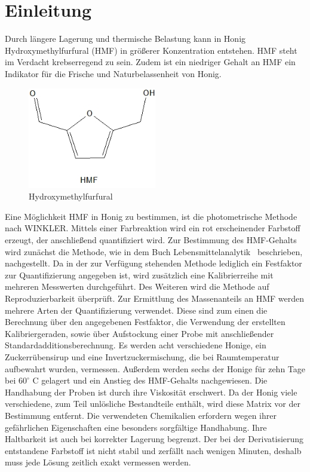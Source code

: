 \chapter{Einleitung} 

Durch längere Lagerung und thermische Belastung kann in Honig Hydroxymethylfurfural (HMF) in größerer Konzentration entstehen. HMF steht im Verdacht krebserregend zu sein. Zudem ist ein niedriger Gehalt an HMF ein Indikator für die Frische und Naturbelassenheit von Honig.
\begin{figure}[htbp]
	\centering
		\includegraphics[width=0.5\textwidth]{../Bilder/HMF.jpg}
	\caption{Hydroxymethylfurfural}
	\label{fig:HMF}
\end{figure}
\newline
Eine Möglichkeit HMF in Honig zu bestimmen, ist die photometrische Methode nach WINKLER. Mittels einer Farbreaktion wird ein rot erscheinender Farbstoff erzeugt, der anschließend quantifiziert wird. Zur  Bestimmung des HMF-Gehalts wird zunächst die Methode, wie in dem Buch Lebensmittelanalytik~\cite{Lebensmittelanalytik} beschrieben, nachgestellt. Da in der zur Verfügung stehenden Methode lediglich ein Festfaktor zur Quantifizierung angegeben ist, wird zusätzlich eine Kalibrierreihe mit mehreren Messwerten durchgeführt. Des Weiteren wird die Methode auf Reproduzierbarkeit überprüft. Zur Ermittlung des Massenanteils an HMF werden mehrere Arten der Quantifizierung verwendet. Diese sind zum einen die Berechnung über den angegebenen Festfaktor, die Verwendung der erstellten Kalibriergeraden, sowie über Aufstockung einer Probe mit anschließender Standardadditionsberechnung. Es werden acht verschiedene Honige, ein Zuckerrübensirup und eine Invertzuckermischung, die bei Raumtemperatur aufbewahrt wurden, vermessen. Außerdem werden sechs der Honige für zehn Tage bei $60^\circ$ C gelagert und ein Anstieg des HMF-Gehalts nachgewiesen. Die Handhabung der Proben ist durch ihre Viskosität erschwert. Da der Honig viele verschiedene, zum Teil unlösliche Bestandteile enthält, wird diese Matrix vor der Bestimmung entfernt. Die verwendeten Chemikalien erfordern wegen ihrer gefährlichen Eigenschaften eine besonders sorgfältige Handhabung. Ihre Haltbarkeit ist auch bei korrekter Lagerung begrenzt. Der bei der Derivatisierung entstandene Farbstoff ist nicht stabil und zerfällt nach wenigen Minuten, deshalb muss jede Lösung zeitlich exakt vermessen werden.~\cite{Winkler}